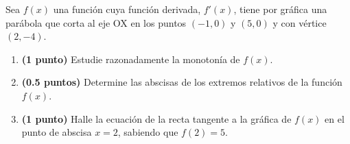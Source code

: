 
Sea $f(x)$ una función cuya función derivada, $f'(x)$, tiene por gráfica una parábola que corta al eje OX en los puntos $(-1,0)$ y $(5,0)$ y con vértice $(2,-4)$.
\begin{enumerate}[label=\alph*)]
\item \textbf{(1 punto)} Estudie razonadamente la monotonía de $f(x)$.
\item \textbf{(0.5 puntos)} Determine las abscisas de los extremos relativos de la función $f(x)$.
\item \textbf{(1 punto)} Halle la ecuación de la recta tangente a la gráfica de $f(x)$ en el punto de abscisa $x=2$, sabiendo que $f(2)=5$.
\end{enumerate}
